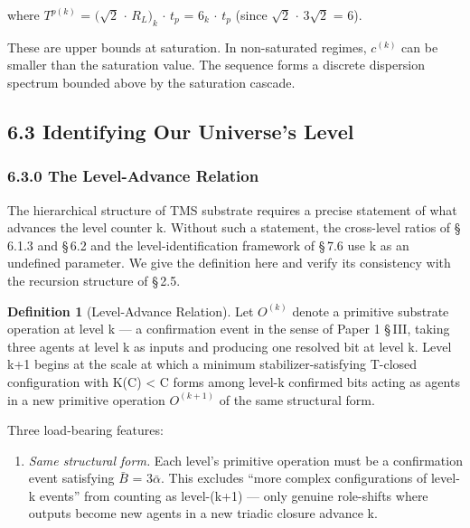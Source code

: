 \documentclass[11pt,oneside]{report}
\theoremstyle{definition}
\newtheorem{definition}[theorem]{Definition}
\theoremstyle{remark}
\begin{document}
where \ensuremath{T^{p(k)}} = \ensuremath{(\sqrt{2}} \ensuremath{\cdot} \ensuremath{R_{L})_{k}} \ensuremath{\cdot} \ensuremath{t_{p}} = \ensuremath{6_{k}} \ensuremath{\cdot} \ensuremath{t_{p}} (since \ensuremath{\sqrt{2}} \ensuremath{\cdot} \ensuremath{3\sqrt{2}} = 6).

These are upper bounds at saturation. In non-saturated regimes, \ensuremath{c^{(k)}}
can be smaller than the saturation value. The sequence forms a discrete
dispersion spectrum bounded above by the saturation cascade.

\subsection*{6.3 Identifying Our Universe's Level}

\subsubsection*{6.3.0 The Level-Advance Relation}

The hierarchical structure of TMS substrate requires a precise statement
of what advances the level counter k. Without such a statement, the
cross-level ratios of \S\,6.1.3 and \S\,6.2 and the level-identification
framework of \S\,7.6 use k as an undefined parameter. We give the
definition here and verify its consistency with the recursion structure
of \S\,2.5.

\begin{definition}[Level-Advance Relation]
Let \ensuremath{O^{(k)}} denote
a primitive substrate operation at level k --- a confirmation event in
the sense of Paper 1 \S\,III, taking three agents at level k as inputs and
producing one resolved bit at level k. Level k+1 begins at the scale at
which a minimum stabilizer-satisfying T-closed configuration with K(C)
\textless{} \textbar C\textbar{} forms among level-k confirmed bits
acting as agents in a new primitive operation \ensuremath{O^{(k+1)}} of the same
structural form.
\end{definition}

Three load-bearing features:

\begin{enumerate}
\def\labelenumi{(\roman{enumi})}
\item
  \emph{Same structural form.} Each level's primitive operation must be
  a confirmation event satisfying \ensuremath{\bar{B}} = \ensuremath{3\bar{\alpha}.} This excludes ``more complex
  configurations of level-k events'' from counting as level-(k+1) ---
  only genuine role-shifts where outputs become new agents in a new
  triadic closure advance k.
\end{enumerate}
\end{document}
